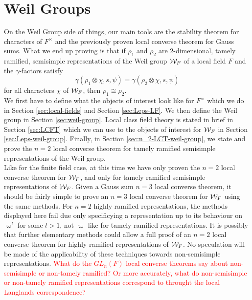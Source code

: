 \section{Weil Groups}
On the Weil Group side of things, our main tools are the stability theorem for characters of $F^\times$ and the previously proven local converse theorem for Gauss sums.
What we end up proving is that if $\rho_1$ and $\rho_2$ are $2$-dimensional, tamely ramified, semisimple representations of the Weil group $\mathcal{W}_F$ of a local field $F$ and the $\gamma$-factors satisfy
\[\gamma(\rho_1 \otimes \chi, s, \psi) = \gamma(\rho_2 \otimes \chi, s, \psi)\]
for all characters $\chi$ of $\mathcal{W}_F$, then $\rho_1 \cong \rho_2$.
\\

We first have to define what the objects of interest look like for $F^\times$ which we do in Section \ref{sec:local-fields} and Section \ref{sec:Leps-LF}.
We then define the Weil group in Section \ref{sec:weil-group}.
Local class field theory is stated in brief in Section \ref{sec:LCFT} which we can use to the objects of interest for $\mathcal{W}_F$ in Section \ref{sec:Leps-weil-group}.
Finally, in Section \ref{sec:n=2-LCT-weil-group}, we state and prove the $n=2$ local converse theorem for tamely ramified semisimple representations of the Weil group.
\\

Like for the finite field case, at this time we have only proven the $n=2$ local converse theorem for $\mathcal{W}_F$, and only for tamely ramified semisimple representations of $\mathcal{W}_F$.
Given a Gauss sum $n=3$ local converse theorem, it should be fairly simple to prove an $n=3$ local converse theorem for $\mathcal{W}_F$ using the same methods.
For $n=2$ highly ramified representations, the methods displayed here fail due only specificying a representation up to its behaviour on $\varpi^l$ for some $l > 1$, not $\varpi$ like for tamely ramified representations.
It is possibly that further elementary methods could allow a full proof of an $n=2$ local converse theorem for highly ramified representations of $\mathcal{W}_F$.
No speculation will be made of the applicability of these techniques towards non-semisimple representations.
\textcolor{red}{What do the $GL_n(F)$ local converse theorems say about non-semisimple or non-tamely ramified? Or more accurately, what do non-semisimple or non-tamely ramified representations correspond to throught the local Langlands correspondence?}
\\
\endinput
